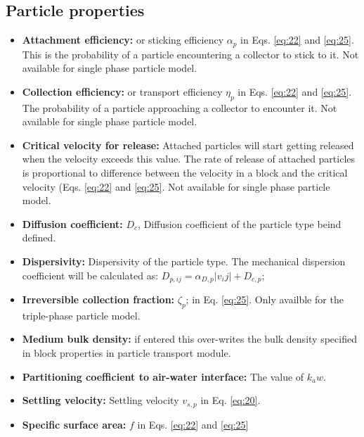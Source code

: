 \subsection{Particle properties}
\begin{itemize}
\item \textbf{Attachment efficiency: } or sticking efficiency $\alpha_p$ in Eqs. \ref{eq:22} and \ref{eq:25}. This is the probability of a particle encountering a collector to stick to it. Not available for single phase particle model. 
\item \textbf{Collection efficiency: } or transport efficiency $\eta_p$ in Eqs. \ref{eq:22} and \ref{eq:25}. The probability of a particle approaching a collector to encounter it. Not available for single phase particle model. 
\item \textbf{Critical velocity for release: } Attached particles will start getting released when the velocity exceeds this value. The rate of release of attached particles is proportional to difference between the velocity in a block and the critical velocity (Eqs. \ref{eq:22} and \ref{eq:25}. Not available for single phase particle model. 
\item \textbf{Diffusion coefficient: } $D_c$, Diffusion coefficient of the particle type beind defined. 
\item \textbf{Dispersivity: } Dispersivity of the particle type. The mechanical dispersion coefficient will be calculated as: $D_{p,ij} = \alpha_{D,p} |v_ij| + D_{c,p}$; 
\item \textbf{Irreversible collection fraction: } $\zeta_p$; in Eq. \ref{eq:25}. Only availble for the triple-phase particle model. 
\item \textbf{Medium bulk density: } if entered this over-writes the bulk density specified in block properties in particle transport module. 
\item \textbf{Partitioning coefficient to air-water interface: } The value of $k_aw$. 
\item \textbf{Settling velocity: } Settling velocity $v_{s,p}$ in Eq. \ref{eq:20}. 
\item \textbf{Specific surface area: } $f$ in Eqs. \ref{eq:22} and \ref{eq:25}
\end{itemize}

